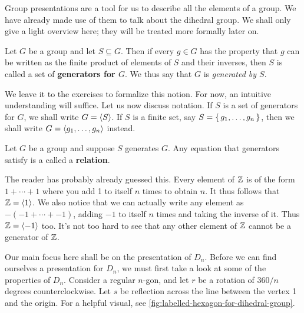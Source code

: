 \documentclass[./main.tex]{subfiles}
\begin{document}
Group presentations are a tool for us to describe all the elements
of a group. We have already made use of them to talk about the dihedral group.
We shall only give a light overview here; they will be treated more formally
later on. 


\begin{definition}[Generator]
\label{def:generator}
    Let $G$ be a group and let $S \subseteq G$. Then if every $g \in G$ has the
    property that $g$ can be written as the finite product of elements of $S$
    and their inverses, then $S$ is called a set of \textbf{generators for $G$}.
    We thus say that $G$ is \emph{generated by $S$}.
\end{definition}
We leave it to the exercises to formalize this notion. For now, an intuitive
understanding will suffice. Let us now discuss notation. If $S$ is a set of
generators for $G$, we shall write $G = { \langle S \rangle }$. If $S$ is a finite set, say $S
= \set{g_1, \dots, g_n}$, then we shall write $G = { \langle g_1, \dots, g_n \rangle }$
instead.

\begin{definition}[Relation]
\label{def:relation}
    Let $G$ be a group and suppose $S$ generates $G$. Any equation that
    generators satisfy is a called a \textbf{relation}.
\end{definition}

\begin{example}[Presentation of $\bZ$]
    The reader has probably already guessed this. Every element of $\bZ$ is of
    the form $1 + \cdots + 1$ where you add 1 to itself $n$ times to obtain $n$.
    It thus follows that $\mathbb{Z} = { \langle 1 \rangle }$. We also notice that we can actually
    write any element as $-( -1 + \cdots + -1)$, adding $-1$ to itself $n$ times
    and taking the inverse of it. Thus $\mathbb{Z} = { \langle -1 \rangle }$ too. It's not too hard
    to see that any other element of $\bZ$ cannot be a generator of $\bZ$.  
\end{example}


Our main focus here shall be on the presentation of $D_n$. Before we can find
ourselves a presentation for $D_n$, we must first take a look at some of the
properties of $D_n$. Consider a regular $n$-gon, and let $r$ be a rotation of
$360/n$ degrees counterclockwise. Let $s$ be reflection across the line between
the vertex 1 and the origin. For a helpful visual, see
\cref{fig:labelled-hexagon-for-dihedral-group}.
\end{document}
